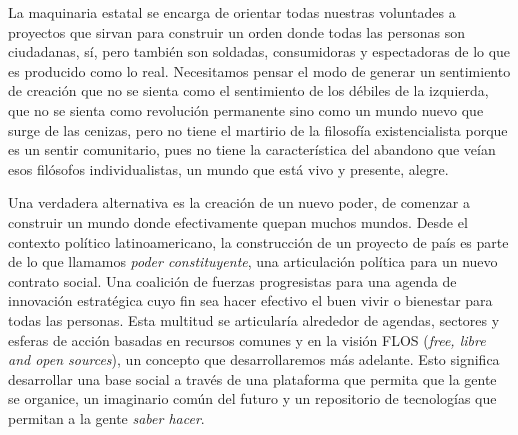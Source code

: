 La maquinaria estatal se encarga de orientar todas nuestras voluntades a proyectos que sirvan para construir un orden donde todas las personas son ciudadanas, sí, pero también son soldadas, consumidoras y espectadoras de lo que es producido como lo real. Necesitamos pensar el modo de generar un sentimiento de creación que no se sienta como el sentimiento de los débiles de la izquierda, que no se sienta como revolución permanente sino como un mundo nuevo que surge de las cenizas, pero no tiene el martirio de la filosofía existencialista porque es un sentir comunitario, pues no tiene la característica del abandono que veían esos filósofos individualistas, un mundo que está vivo y presente, alegre.

Una verdadera alternativa es la creación de un nuevo poder, de comenzar a construir un mundo donde efectivamente quepan muchos mundos. Desde el contexto político latinoamericano, la construcción de un proyecto de país es parte de lo que llamamos \emph{poder constituyente}, una articulación política para un nuevo contrato social. Una coalición de fuerzas progresistas para una agenda de innovación estratégica cuyo fin sea hacer efectivo el buen vivir o bienestar para todas las personas. Esta multitud se articularía alrededor de agendas, sectores y esferas de acción basadas en recursos comunes y en la visión FLOS (\emph{free, libre and open sources}), un concepto que desarrollaremos más adelante. Esto significa desarrollar una base social a través de una plataforma que permita que la gente se organice, un imaginario común del futuro y un repositorio de tecnologías que permitan a la gente \emph{saber hacer}.

